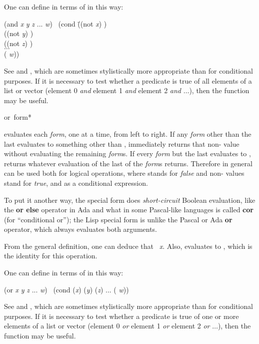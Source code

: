 \begin{defmac}
One can define  in terms of  in this way:
\begin{lisp}
(and \emph{x} \emph{y} \emph{z} ... \emph{w}) \EQ\ (cond \=((not \emph{x}) {\false}) \\
\>((not \emph{y}) {\false}) \\
\>((not \emph{z}) {\false}) \\
\>$\ldots$ \\
\>({\true} \emph{w}))
\end{lisp}

See  and , which are sometimes stylistically
more appropriate than  for conditional purposes.
If it is necessary to test whether a predicate is true
of all elements of a list or vector (element 0 \emph{and} element 1 \emph{and}
element 2 \emph{and} $\ldots$), then the function  may be useful.
\end{defmac}

\begin{defmac}
or {\,form}*

 evaluates each \emph{form}, one at a time,
from left to right.  If any \emph{form} other than the last
evaluates to something other than {\false},
immediately returns that non-{\false} value without evaluating the remaining
\emph{form\/}s.  If every \emph{form} but the last evaluates to {\false},
 returns whatever evaluation of the last of the \emph{form\/}s returns.
Therefore in general  can be used both for logical operations,
where {\false} stands for \emph{false} and non-{\false} values stand for \emph{true},
and as a conditional expression.

To put it another way,
the  special form does \emph{short-circuit} Boolean evaluation,
like the \textbf{or else} operator in Ada
and what in some Pascal-like languages is called \textbf{cor} (for ``conditional
or''); the Lisp  special form is
unlike the Pascal or Ada \textbf{or} operator,
which always evaluates both arguments.

From the general definition, one can deduce that
 \EQ\ \emph{x}.  Also,
 evaluates to {\nil}, which is the identity for this operation.

One can define  in terms of  in this way:
\begin{lisp}
(or \emph{x} \emph{y} \emph{z} ... \emph{w}) \EQ\ (cond (\emph{x}) (\emph{y}) (\emph{z}) ... ({\true} \emph{w}))
\end{lisp}

See  and , which are sometimes
stylistically more appropriate than  for conditional purposes.
If it is necessary to test whether a predicate is true of
one or more elements of a list or vector (element 0 \emph{or} element 1 \emph{or}
element 2 \emph{or} $\ldots$), then the function  may be useful.
\end{defmac}

